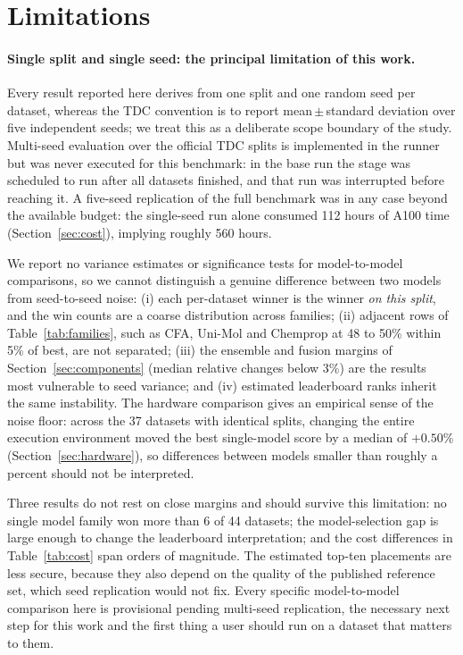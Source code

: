 \section{Limitations}\label{sec:limitations}

\paragraph{Single split and single seed: the principal limitation of this work.} Every result reported here derives from one split and one random seed per dataset, whereas the TDC convention is to report mean\,$\pm$\,standard deviation over five independent seeds; we treat this as a deliberate scope boundary of the study. Multi-seed evaluation over the official TDC splits is implemented in the runner but was never executed for this benchmark: in the base run the stage was scheduled to run after all datasets finished, and that run was interrupted before reaching it. A five-seed replication of the full benchmark was in any case beyond the available budget: the single-seed run alone consumed 112 hours of A100 time (Section~\ref{sec:cost}), implying roughly 560 hours.

We report no variance estimates or significance tests for model-to-model comparisons, so we cannot distinguish a genuine difference between two models from seed-to-seed noise: (i) each per-dataset winner is the winner \emph{on this split}, and the win counts are a coarse distribution across families; (ii) adjacent rows of Table~\ref{tab:families}, such as CFA, Uni-Mol and Chemprop at 48 to 50\% within 5\% of best, are not separated; (iii) the ensemble and fusion margins of Section~\ref{sec:components} (median relative changes below 3\%) are the results most vulnerable to seed variance; and (iv) estimated leaderboard ranks inherit the same instability. The hardware comparison gives an empirical sense of the noise floor: across the 37 datasets with identical splits, changing the entire execution environment moved the best single-model score by a median of $+0.50$\% (Section~\ref{sec:hardware}), so differences between models smaller than roughly a percent should not be interpreted.

Three results do not rest on close margins and should survive this limitation: no single model family won more than 6 of 44 datasets; the model-selection gap is large enough to change the leaderboard interpretation; and the cost differences in Table~\ref{tab:cost} span orders of magnitude. The estimated top-ten placements are less secure, because they also depend on the quality of the published reference set, which seed replication would not fix. Every specific model-to-model comparison here is provisional pending multi-seed replication, the necessary next step for this work and the first thing a user should run on a dataset that matters to them.

